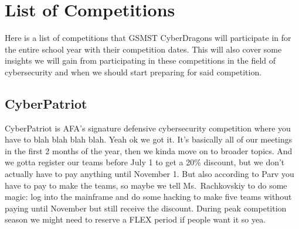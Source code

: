\documentclass[
  letterpaper,
  DIV=11,
  numbers=noendperiod]{scrartcl}
\renewcommand*\contentsname{Table of contents}
\newcommand\contentsname{Table of contents}
\begin{document}
\renewcommand*\contentsname{Table of Contents}
{
\hypersetup{linkcolor=}
\setcounter{tocdepth}{6}
\tableofcontents
{}
}
\newpage{}

\hypertarget{list-of-competitions}{%
\section{List of Competitions}\label{list-of-competitions}}

Here is a list of competitions that GSMST CyberDragons will participate
in for the entire school year with their competition dates. This will
also cover some insights we will gain from participating in these
competitions in the field of cybersecurity and when we should start
preparing for said competition.

\hypertarget{cyberpatriot}{%
\subsection{CyberPatriot}\label{cyberpatriot}}

CyberPatriot is AFA's signature defensive cybersecurity competition
where you have to blah blah blah blah. Yeah ok we got it. It's basically
all of our meetings in the first 2 months of the year, then we kinda
move on to broader topics. And we gotta register our teams before July 1
to get a 20\% discount, but we don't actually have to pay anything until
November 1. But also according to Parv you have to pay to make the
teams, so maybe we tell Ms.~Rachkovskiy to do some magic: log into the
mainframe and do some hacking to make five teams without paying until
November but still receive the discount. During peak competition season
we might need to reserve a FLEX period if people want it so yea.
\end{document}
